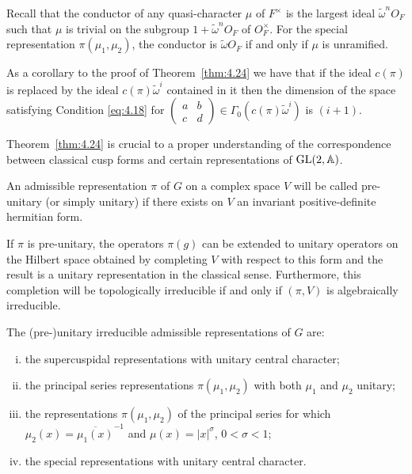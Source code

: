 Recall that the conductor of any quasi-character $\mu$ of $F^{\times}$ is the largest ideal $\widetilde{\omega}^nO_F$ such that $\mu$ is trivial on the subgroup $1 + \widetilde{\omega}^nO_F$ of $O_F^{\times}$. For the special representation $\pi(\mu_1, \mu_2)$, the conductor is $\widetilde{\omega}O_F$ if and only if $\mu$ is unramified.

As a corollary to the proof of Theorem~\ref{thm:4.24} we have that if the ideal $c(\pi)$ is replaced by the ideal $c(\pi)\widetilde{\omega}^i$ contained in it then the dimension of the space satisfying Condition \eqref{eq:4.18} for $\begin{pmatrix} a & b \\ c & d \end{pmatrix} \in \Gamma_0(c(\pi)\widetilde{\omega}^i)$ is $(i + 1)$.

Theorem~\ref{thm:4.24} is crucial to a proper understanding of the correspondence between classical cusp forms and certain representations of $\operatorname{GL}(2,\mathbb{A})$.

\begin{definition}\label{def:4.26}

An admissible representation $\pi$ of $G$ on a complex space $V$ will be called pre-unitary (or simply unitary) if there exists on $V$ an invariant positive-definite hermitian form.

\end{definition}

If $\pi$ is pre-unitary, the operators $\pi(g)$ can be extended to unitary operators on the Hilbert space obtained by completing $V$ with respect to this form and the result is a unitary representation in the classical sense. Furthermore, this completion will be topologically irreducible if and only if $(\pi, V)$ is algebraically irreducible.

\begin{theorem}\label{thm:4.27}

The (pre-)unitary irreducible admissible representations of $G$ are:

\begin{enumerate}[(i)]

\item the supercuspidal representations with unitary central character;

\item the principal series representations $\pi(\mu_1, \mu_2)$ with both $\mu_1$ and $\mu_2$ unitary;

\item the representations $\pi(\mu_1, \mu_2)$ of the principal series for which $\mu_2(x) = \overline{\mu_1(x)}^{-1}$ and $\mu(x) = |x|^{\sigma}$, $0 < \sigma < 1$;

\item the special representations with unitary central character.

\end{enumerate}

\end{theorem}

